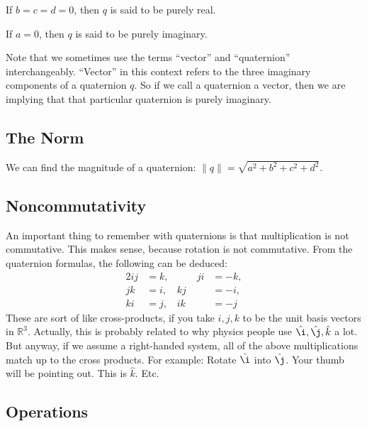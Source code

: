 \documentclass[12pt]{article}
\begin{document}
	If $b = c = d = 0$, then $q$ is said to be purely real.
	
	If $a = 0$, then $q$ is said to be purely imaginary.
	
	Note that we sometimes use the terms ``vector'' and ``quaternion'' interchangeably. 
	``Vector'' in this context refers to the three imaginary components of a quaternion $q$. 
	So if we call a quaternion a vector, then we are implying that that particular quaternion is purely imaginary.

	\subsection{The Norm}
	
	We can find the magnitude of a quaternion: $\|q\| = \sqrt{a^2 + b^2 + c^2 + d^2}$.
		
	\subsection{Noncommutativity}
	
	An important thing to remember with quaternions is that multiplication is not commutative. 
	This makes sense, because rotation is not commutative. 
	From the quaternion formulas, the following can be deduced:	
		\begin{alignat*}{2}
			ij & = k, & \qquad ji & = -k, \\
			jk & = i, & kj & = -i, \\
			ki & = j, & ik & = -j 
		\end{alignat*}	
	These are sort of like cross-products, if you take $i, j, k$ to be the unit basis vectors in $\mathbb{R}^3$. 
	Actually, this is probably related to why physics people use $\hat{\i}, \hat{\j}, \hat{k}$ a lot. 
	But anyway, if we assume a right-handed system, all of the above multiplications match up to the cross products. 
	For example: Rotate $\hat{\i}$ into $\hat{\j}$. 
	Your thumb will be pointing out. 
	This is $\hat{k}$. 
	Etc.

	\subsection{Operations}
	
\end{document}
